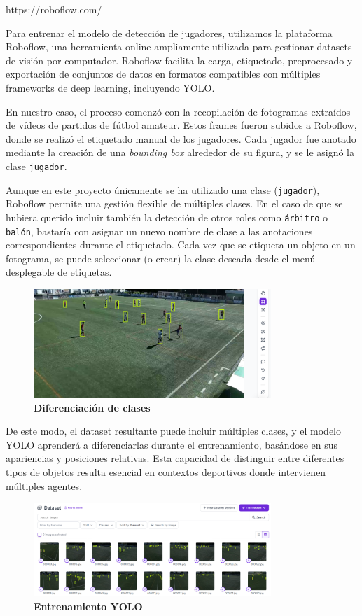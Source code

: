 \documentclass[12pt, a4paper, twoside]{article}
\begin{document}
	https://roboflow.com/
	
	Para entrenar el modelo de detección de jugadores, utilizamos la plataforma Roboflow, una herramienta online ampliamente utilizada para gestionar datasets de visión por computador. Roboflow facilita la carga, etiquetado, preprocesado y exportación de conjuntos de datos en formatos compatibles con múltiples frameworks de deep learning, incluyendo YOLO.
	
	En nuestro caso, el proceso comenzó con la recopilación de fotogramas extraídos de vídeos de partidos de fútbol amateur. Estos frames fueron subidos a Roboflow, donde se realizó el etiquetado manual de los jugadores. Cada jugador fue anotado mediante la creación de una \textit{bounding box} alrededor de su figura, y se le asignó la clase \texttt{jugador}.
	
	Aunque en este proyecto únicamente se ha utilizado una clase (\texttt{jugador}), Roboflow permite una gestión flexible de múltiples clases. En el caso de que se hubiera querido incluir también la detección de otros roles como \texttt{árbitro} o \texttt{balón}, bastaría con asignar un nuevo nombre de clase a las anotaciones correspondientes durante el etiquetado. Cada vez que se etiqueta un objeto en un fotograma, se puede seleccionar (o crear) la clase deseada desde el menú desplegable de etiquetas.
	
	
	\begin{figure}[H]
		\centering
		\includegraphics[width=0.8\textwidth]{image/dif_de_clases}
		\caption{\textbf{Diferenciación de clases}}
		\label{dif_de_clases}
	\end{figure}
	
	De este modo, el dataset resultante puede incluir múltiples clases, y el modelo YOLO aprenderá a diferenciarlas durante el entrenamiento, basándose en sus apariencias y posiciones relativas. Esta capacidad de distinguir entre diferentes tipos de objetos resulta esencial en contextos deportivos donde intervienen múltiples agentes.
	
	\begin{figure}[H]
		\centering
		\includegraphics[width=0.8\textwidth]{image/entr_yolo}
		\caption{\textbf{Entrenamiento YOLO}}
		\label{entr_yolo}
	\end{figure}
	
\end{document}
